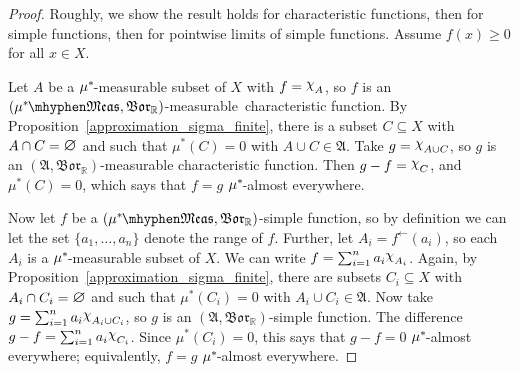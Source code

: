\documentclass[
twoside=true,
paper=letter,
fontsize=11pt,
pagesize=auto,
leqno,
openany,
headsepline,
overfullrule,
]{scrbook}
\theoremstyle{plain}
\theoremstyle{plain}
\theoremstyle{definition}
\theoremstyle{bfnoteitalic}
\theoremstyle{bfnoteroman}
\newcommand{\sigalg}[1]{\mathfrak{#1}}
\newcommand{\borel}{\mathfrak{Bor}}
\newcommand{\charfunction}[1]{{\raisebox{2pt}{$\chi$}}_{#1}}
\newcommand{\mtset}{\hbox{\large{$\varnothing$}}}
\newcommand{\preimage}[1]{#1^{\leftarrow}}
\newcommand{\R}{\mathbb{R}}
\newcommand{\meets}{\cap}
\newcommand{\sigmaalgebra}{\sigalg{A}}
\newcommand{\measurable}[1]{{#1}\mhyphen\mathfrak{Meas}}
\newcommand{\kernast}{\ast\kern-1pt}
\newcommand{\mbmeasurable}{$(\measurable{\measure^\kernast},\borel_\R)$\hyp{}measurable}
\newcommand{\measurespace}{X}
\newcommand{\measure}{\mu}
\begin{document}
\begin{proof}
Roughly, we show the result holds for characteristic functions, then for simple functions, then for pointwise limits of simple functions. 
Assume $f(x)\geq 0$ for all $x\in\measurespace$.

Let $A$ be a  $\measure^\kernast$-measurable subset of $\measurespace$ with  $f=\charfunction{A}$, so $f$ is an \mbmeasurable\ characteristic function. By Proposition~\ref{approximation_sigma_finite}, there is a subset $C\subseteq\measurespace$ with $A\meets C =\mtset$ and  such that $\measure^*(C) = 0$ with $A\cup C\in \sigmaalgebra$.  
Take $g=\charfunction{A\cup C}$, so $g$ is an $(\sigmaalgebra,\borel_\R)$\hyp{}measurable characteristic function. Then $g-f = \charfunction{C}$, and $\measure^*(C) = 0$, which says that $f=g$ $\measure^\kernast$-almost everywhere.

Now let $f$ be a $(\measurable{\measure^\kernast},\borel_\R)$-simple function, so by definition we can let the set $\{a_1,\ldots, a_n\}$ denote the range of $f$. Further, let $A_i = \preimage{f}(a_i)$, so each $A_i$ is a $\measure^\kernast$-measurable subset of $\measurespace$. We can write $f=\sum_{i=1}^n a_i\charfunction{A_i}$.
Again, by Proposition~\ref{approximation_sigma_finite}, there are subsets $C_i\subseteq\measurespace$ with $A_i\meets C_i =\mtset$ and  such that $\measure^*(C_i) = 0$ with $A_i\cup C_i\in \sigmaalgebra$.  
Now take $g=\sum_{i=1}^n a_i\charfunction{A_i\cup C_i}$, so $g$ is an $(\sigmaalgebra,\borel_\R)$-simple function. The difference $g-f = \sum_{i=1}^n a_i\charfunction{C_i}$. Since $\measure^*(C_i)=0$, this says that $g-f = 0$ $\measure^\kernast$-almost everywhere; equivalently, $f=g$ $\measure^\kernast$-almost everywhere.


\end{proof}
\end{document}
